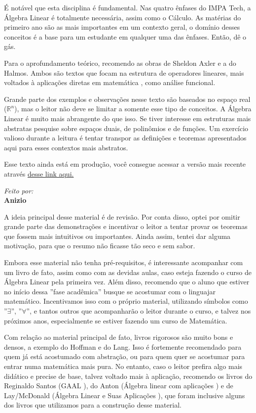 \documentclass[../main.tex]{subfiles}
\begin{document}
	É notável que esta disciplina é fundamental. Nas quatro ênfases do IMPA Tech, a Álgebra Linear é totalmente necessária, assim como o Cálculo. As matérias do primeiro ano são as mais importantes em um contexto geral, o domínio desses conceitos é a base para um estudante em qualquer uma das ênfases. Então, dê o gás.
	
	Para o aprofundamento teórico, recomendo as obras de Sheldon Axler e a do Halmos. Ambos são textos que focam na estrutura de operadores lineares, mais voltados à aplicações diretas em matemática , como análise funcional. 
	
	Grande parte dos exemplos e observações nesse texto são baseados no espaço real ($\mathbb{R}^n$), mas o leitor não deve se limitar a somente esse tipo de conceitos. A Álgebra Linear é muito mais abrangente do que isso. Se tiver interesse em estruturas mais abstratas pesquise sobre espaços duais, de polinômios e de funções. Um exercício valioso durante a leitura é tentar transpor as definições e teoremas apresentados aqui para esses contextos mais abstratos.
	
	Esse texto ainda está em produção, você consegue acessar a versão mais recente através \href{https://sites.google.com/view/anizio}{desse link aqui.}
	
	\vfill 
	
	\begin{flushright}
		\textit{Feito por:}\\
		\textbf{Anizio}
	\end{flushright}
	
	\newpage
	A ideia principal desse material é de revisão. Por conta disso, optei por omitir grande parte das demonstrações e incentivar o leitor a tentar provar os teoremas que fossem mais intuitivos ou importantes. Ainda assim, tentei dar alguma motivação, para que o resumo não ficasse tão seco e sem sabor.
	
	Embora esse material não tenha pré-requisitos, é interessante acompanhar com um livro de fato, assim como com as devidas aulas, caso esteja fazendo o curso de Álgebra Linear pela primeira vez. Além disso, recomendo que o aluno que estiver no início dessa ''fase acadêmica'' busque se acostumar com o linguajar matemático. Incentivamos isso com o próprio material, utilizando símbolos como ''$\exists$'', ''$\forall$'', e tantos outros que acompanharão o leitor durante o curso, e talvez nos próximos anos, especialmente se estiver fazendo um curso de Matemática.
	
	Com relação ao material principal de fato, livros rigorosos são muito bons e densos, a exemplo do Hoffman e do Lang. Isso é fortemente recomendado para quem já está acostumado com abstração, ou para quem quer se acostumar para entrar numa matemática mais pura. No entanto, caso o leitor prefira algo mais didático e precise de base, talvez voltado mais à aplicação, recomendo os livros do Reginaldo Santos (GAAL \cite{santos}), do Anton (Álgebra linear com aplicações \cite{anton}) e de Lay/McDonald (Álgebra Linear e Suas Aplicações \cite{lay}), que foram inclusive alguns dos livros que utilizamos para a construção desse material.
	
\end{document}
